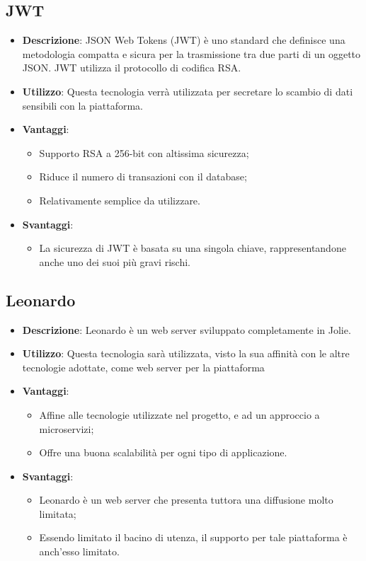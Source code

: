 \subsection{JWT}
\begin{itemize}
	\item \textbf{Descrizione}: JSON Web Tokens (JWT) è uno standard che definisce una metodologia compatta e sicura per la trasmissione tra due parti di un oggetto JSON. JWT utilizza il protocollo di codifica RSA.
	\item \textbf{Utilizzo}: Questa tecnologia verrà utilizzata per secretare lo scambio di dati sensibili con la piattaforma.
	\item \textbf{Vantaggi}:
	\begin{itemize}
		\item Supporto RSA a 256-bit con altissima sicurezza;
		\item Riduce il numero di transazioni con il database;
		\item Relativamente semplice da utilizzare.
	\end{itemize}
	\item \textbf{Svantaggi}:
	\begin{itemize}
		\item La sicurezza di JWT è basata su una singola chiave, rappresentandone anche uno dei suoi più gravi rischi.
	\end{itemize}
\end{itemize}

\subsection{Leonardo}
\begin{itemize}
	\item \textbf{Descrizione}: Leonardo è un web server sviluppato completamente in Jolie. 
	\item \textbf{Utilizzo}: Questa tecnologia sarà utilizzata, visto la sua affinità con le altre tecnologie adottate, come web server per la piattaforma
	\item \textbf{Vantaggi}:
	\begin{itemize}
		\item Affine alle tecnologie utilizzate nel progetto, e ad un approccio a microservizi;
		\item Offre una buona scalabilità per ogni tipo di applicazione.
	\end{itemize}
	\item \textbf{Svantaggi}:
	\begin{itemize}
		\item Leonardo è un web server che presenta tuttora una diffusione molto limitata;
		\item Essendo limitato il bacino di utenza, il supporto per tale piattaforma è anch'esso limitato.
	\end{itemize}
\end{itemize}

